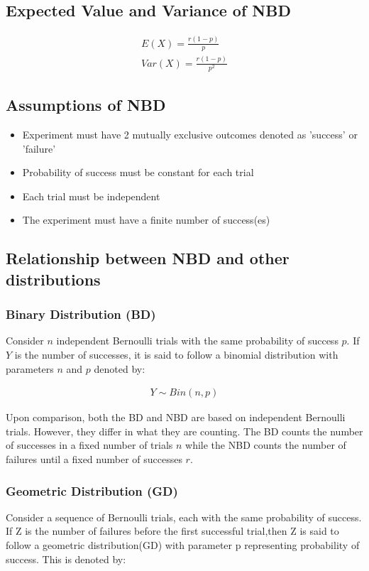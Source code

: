 \documentclass{article}
\begin{document}
\subsection{Expected Value and Variance of NBD}
\begin{gather*}
  E(X) = \frac{r(1-p)}{p} \\[5pt]
  Var(X) = \frac{r(1-p)}{p^2}
\end{gather*}

\subsection{Assumptions of NBD}
\begin{itemize}
  \item Experiment must have 2 mutually exclusive outcomes denoted as
    'success' or 'failure'
  \item Probability of success must be constant for each trial
  \item Each trial must be independent
  \item The experiment must have a finite number of success(es)
\end{itemize}

\subsection{Relationship between NBD and other distributions}
\subsubsection{Binary Distribution (BD)}
Consider $ n $ independent Bernoulli trials with the same probability 
of success $ p $. If $ Y $ is the number of successes, it is said
to follow a binomial distribution with parameters $ n $ and $ p $
denoted by:



\begin{gather*}
  Y \sim Bin(n, p)
\end{gather*}

Upon comparison, both the BD and NBD are based on independent 
Bernoulli trials. However, they differ in what they are counting.
The BD counts the number of successes in a fixed number of 
trials $ n $ while the NBD counts the number of failures until
a fixed number of successes $ r $.

\subsubsection{Geometric Distribution (GD)}
Consider a sequence of Bernoulli trials, each with the same probability 
of success. If Z is the number of failures before the first successful 
trial,then Z is said to follow a geometric distribution(GD) with parameter 
p representing probability of success. This is denoted by:
\end{document}
